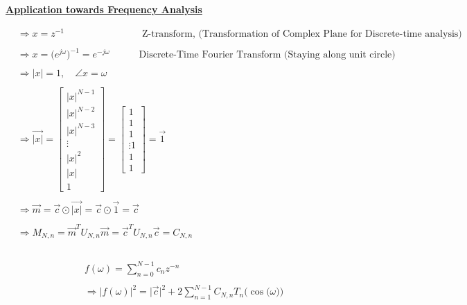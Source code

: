\documentclass{article}
\begin{document}
\textbf{\underline{Application towards Frequency Analysis}}

\begin{align*}
    & \Rightarrow x = z^{-1} \quad \quad \quad \quad \quad \quad \quad \quad \text{Z-transform, (Transformation of Complex Plane for Discrete-time analysis)} \\ \\
    & \Rightarrow x = \big(e^{j\omega}\big)^{-1} = e^{-j\omega} \quad \quad \quad \text{Discrete-Time Fourier Transform (Staying along unit circle)} \\ \\
    & \Rightarrow |x| = 1, \quad \angle{x} = \omega \\ \\
    & \Rightarrow \vec{|x|} = \begin{bmatrix}
                                    |x|^{N - 1} \\
                                    |x|^{N - 2} \\
                                    |x|^{N - 3} \\
                                    \vdots \\
                                    |x|^{2} \\
                                    |x| \\
                                    1
                                \end{bmatrix}
                            = \begin{bmatrix}
                                    1 \\
                                    1 \\
                                    1 \\
                                    \vdots
                                    1 \\
                                    1 \\
                                    1
                                \end{bmatrix} = \vec{1} \\ \\
    & \Rightarrow \vec{m} = \vec{c} \odot \vec{|x|} = \vec{c} \odot \vec{1} = \vec{c} \\ \\
    & \Rightarrow M_{N, n} = \vec{m}^{T}U_{N, n}\vec{m} = \vec{c}^{T}U_{N, n}\vec{c} = C_{N, n} 
\end{align*}

\begin{align*}
    & \\ \\
    & f(\omega) = \sum_{n = 0}^{N - 1}c_{n}z^{-n} \\ \\
    &\Rightarrow |f(\omega)|^{2} = \big|\vec{c}\big|^{2} + 2\sum_{n=1}^{N - 1}C_{N, n}T_{n}\Big(\cos\big(\omega\big)\Big) 
\end{align*}
\end{document}
